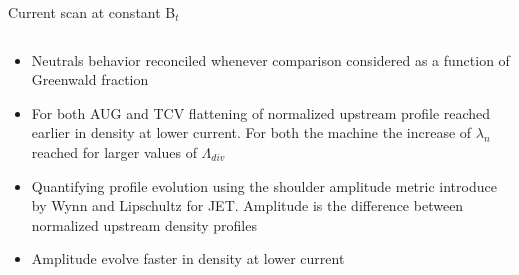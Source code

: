 \documentclass[10pt, compress]{beamer}
\begin{document}
\begin{frame}{Current scan at constant B$_t$}
\begin{columns}
\begin{column}{0.4\textwidth}
\begin{itemize}
        \item<5|only@5> Neutrals behavior reconciled whenever
          comparison considered as a function of Greenwald fraction  
        \item<6|only@6> For both AUG and TCV flattening of normalized
          upstream profile reached \alert{earlier in density at lower
            current.} For both the machine the increase of $\lambda_n$
          reached for larger values of $\Lambda_{div}$
        \item<7|only@7> Quantifying profile evolution using the
          \alert{shoulder amplitude metric} introduce by Wynn and
          Lipschultz for JET. \alert{Amplitude is the difference
            between normalized upstream density profiles}
        \item<8-9> Amplitude evolve faster in density at lower
          current   
      \end{itemize}
    \end{column}
  \end{columns}
\end{frame}  
\end{document}
